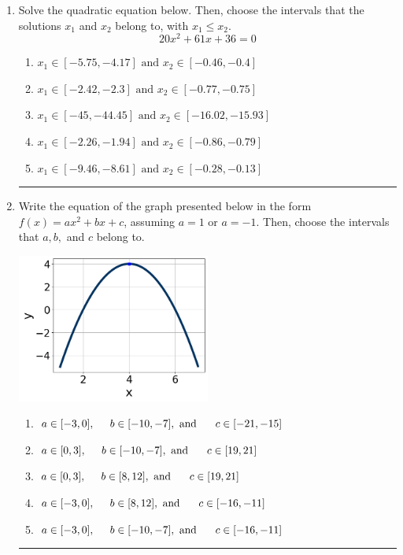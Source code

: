 \documentclass[14pt]{extbook}
\newcommand{\litem}[1]{\item#1\hspace*{-1cm}\rule{\textwidth}{0.4pt}}
\begin{document}
\begin{enumerate}
{\begin{enumerate}[label=\Alph*.]
\end{enumerate} }
\litem{
Solve the quadratic equation below. Then, choose the intervals that the solutions $x_1$ and $x_2$ belong to, with $x_1 \leq x_2$.\[ 20x^{2} +61 x + 36 = 0 \]\begin{enumerate}[label=\Alph*.]
\item \( x_1 \in [-5.75, -4.17] \text{ and } x_2 \in [-0.46, -0.4] \)
\item \( x_1 \in [-2.42, -2.3] \text{ and } x_2 \in [-0.77, -0.75] \)
\item \( x_1 \in [-45, -44.45] \text{ and } x_2 \in [-16.02, -15.93] \)
\item \( x_1 \in [-2.26, -1.94] \text{ and } x_2 \in [-0.86, -0.79] \)
\item \( x_1 \in [-9.46, -8.61] \text{ and } x_2 \in [-0.28, -0.13] \)

\end{enumerate} }
\litem{
Write the equation of the graph presented below in the form $f(x)=ax^2+bx+c$, assuming  $a=1$ or $a=-1$. Then, choose the intervals that $a, b,$ and $c$ belong to.
\begin{center}
    \includegraphics[width=0.5\textwidth]{../Figures/quadraticGraphToEquationCopyC.png}
\end{center}
\begin{enumerate}[label=\Alph*.]
\item \( a \in [-3, 0], \hspace*{5mm} b \in [-10, -7], \text{ and } \hspace*{5mm} c \in [-21, -15] \)
\item \( a \in [0, 3], \hspace*{5mm} b \in [-10, -7], \text{ and } \hspace*{5mm} c \in [19, 21] \)
\item \( a \in [0, 3], \hspace*{5mm} b \in [8, 12], \text{ and } \hspace*{5mm} c \in [19, 21] \)
\item \( a \in [-3, 0], \hspace*{5mm} b \in [8, 12], \text{ and } \hspace*{5mm} c \in [-16, -11] \)
\item \( a \in [-3, 0], \hspace*{5mm} b \in [-10, -7], \text{ and } \hspace*{5mm} c \in [-16, -11] \)


\end{enumerate}}
\end{enumerate}
\end{document}
